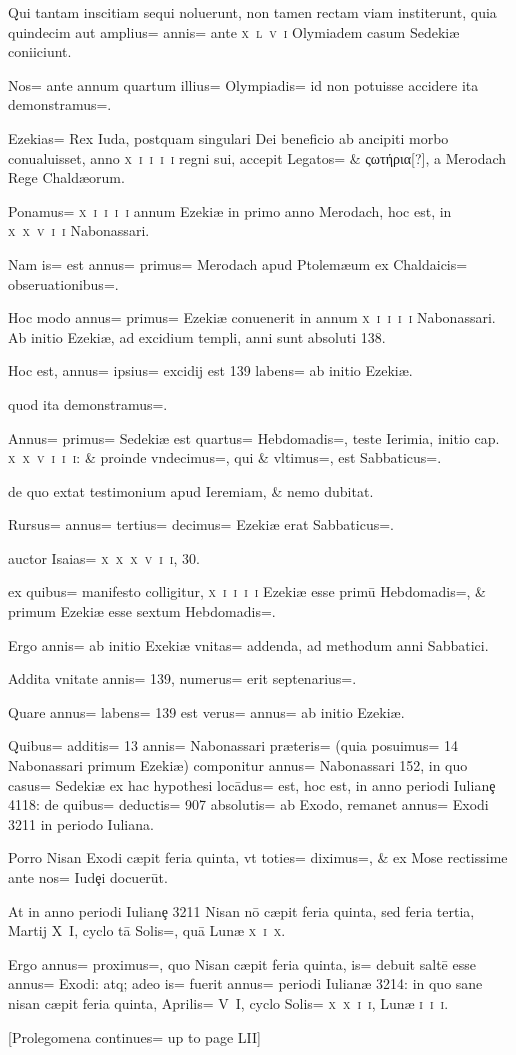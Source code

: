 \begin{parnumbers}
Qui tantam inscitiam sequi noluerunt, non tamen rectam viam institerunt, quia quindecim aut amplius= annis= ante \textsc{x~l~v~i} Olymiadem casum Sedekiæ coniiciunt.

Nos= ante annum quartum illius= Olympiadis= id non potuisse accidere ita demonstramus=. 

Ezekias= Rex Iuda, postquam singulari Dei beneficio ab ancipiti morbo conualuisset, anno \textsc{x~i~i~i~i} regni sui, accepit Legatos= \& ςωτήρια[?], a Merodach Rege Chaldæorum.

Ponamus= \textsc{x~i~i~i~i} annum Ezekiæ in primo anno Merodach, hoc est, in \textsc{x~x~v~i~i} Nabonassari.

Nam is= est annus= primus= Merodach apud Ptolemæum ex Chaldaicis= obseruationibus=. 

Hoc modo annus= primus= Ezekiæ conuenerit in annum \textsc{x~i~i~i~i} Nabonassari. Ab initio Ezekiæ, ad excidium templi, anni sunt absoluti 138.

Hoc est, annus= ipsius= excidij est 139 labens= ab initio Ezekiæ.

quod ita demonstramus=. 

Annus= primus= Sedekiæ est quartus= Hebdomadis=, teste Ierimia, initio cap. \textsc{x~x~v~i~i~i}: \& proinde vndecimus=, qui \& vltimus=, est Sabbaticus=. 

de quo extat testimonium apud Ieremiam, \& nemo dubitat.

Rursus= annus= tertius= decimus= Ezekiæ erat Sabbaticus=. 

auctor Isaias= \textsc{x~x~x~v~i~i}, 30.

ex quibus= manifesto colligitur, \textsc{x~i~i~i~i} Ezekiæ esse primū Hebdomadis=, \& primum Ezekiæ esse sextum Hebdomadis=. 

Ergo annis= ab initio Exekiæ vnitas= addenda, ad methodum anni Sabbatici.

Addita vnitate annis= 139, numerus= erit septenarius=. 

Quare annus= labens= 139 est verus= annus= ab initio Ezekiæ.

Quibus= additis= 13 annis= Nabonassari præteris= (quia posuimus= 14 Nabonassari primum Ezekiæ) componitur annus= Nabonassari 152, in quo casus= Sedekiæ ex hac hypothesi locādus= est, hoc est, in anno periodi Iulianȩ 4118: de quibus= deductis= 907 absolutis= ab Exodo, remanet annus= Exodi 3211 in periodo Iuliana.

Porro Nisan Exodi cæpit feria quinta, vt toties= diximus=, \& ex Mose rectissime ante nos= Iudȩi docuerūt.

At in anno periodi Iulianȩ 3211 Nisan nō cæpit feria quinta, sed feria tertia, Martij \textsc{X~I}, cyclo tā Solis=, quā Lunæ \textsc{x~i~x}.

Ergo annus= proximus=, quo Nisan cæpit feria quinta, is= debuit saltē esse annus= Exodi: atq; adeo is= fuerit annus= periodi Iulianæ 3214: in quo sane nisan cæpit feria quinta, Aprilis= \textsc{V~I},
cyclo Solis= \textsc{x~x~i~i}, Lunæ \textsc{i~i~i}.

[Prolegomena continues= up to page LII]

\end{parnumbers}

